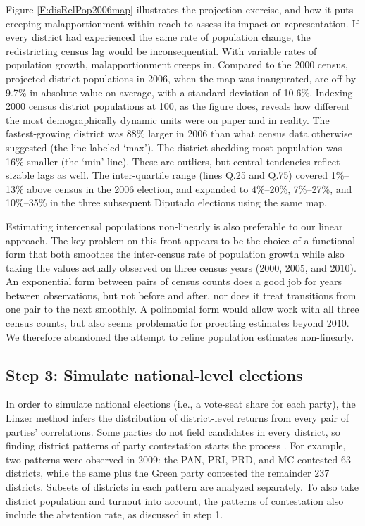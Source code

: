\documentclass[letter,12pt]{article}
\begin{document}
Figure \ref{F:disRelPop2006map} illustrates the projection exercise, and how it puts creeping malapportionment within reach to assess its impact on representation. If every district had experienced the same rate of population change, the redistricting census lag would be inconsequential. With variable rates of population growth, malapportionment creeps in. Compared to the 2000 census, projected district populations in 2006, when the map was inaugurated, are off by 9.7\% in absolute value on average, with a standard deviation of 10.6\%. Indexing 2000 census district populations at 100, as the figure does, reveals how different the most demographically dynamic units were on paper and in reality. The fastest-growing district was 88\% larger in 2006 than what census data otherwise suggested (the line labeled `max'). The district shedding most population was 16\% smaller (the `min' line). These are outliers, but central tendencies reflect sizable lags as well. The inter-quartile range (lines Q.25 and Q.75) covered 1\%--13\% above census in the 2006 election, and expanded to 4\%--20\%, 7\%--27\%, and 10\%--35\% in the three subsequent Diputado elections using the same map.

Estimating intercensal populations non-linearly is also preferable to our linear approach. The key problem on this front appears to be the choice of a functional form that both smoothes the inter-census rate of population growth while also taking the values actually observed on three census years (2000, 2005, and 2010). An exponential form between pairs of census counts \citep{dasGupta1978RateGrowth} does a good job for years between observations, but not before and after, nor does it treat transitions from one pair to the next smoothly. A polinomial form would allow work with all three census counts, but also seems problematic for proecting estimates beyond 2010. We therefore abandoned the attempt to refine population estimates non-linearly.

\subsection*{Step 3: Simulate national-level elections}

In order to simulate national elections (i.e., a vote-seat share for each party), the Linzer method infers the distribution of district-level returns from every pair of parties' correlations. Some parties do not field candidates in every district, so finding district patterns of party contestation starts the process \citep[][:405]{linzerSeatVoteElasticity2012}. For example, two patterns were observed in 2009: the PAN, PRI, PRD, and MC contested 63 districts, while the same plus the Green party contested the remainder 237 districts. Subsets of districts in each pattern are analyzed separately. To also take district population and turnout into account, the patterns of contestation also include the abstention rate, as discussed in step 1. 
\end{document}
